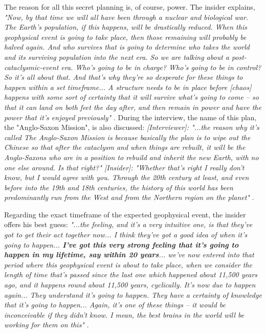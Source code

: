 \documentclass[10pt,twocolumn,letterpaper]{article}
\begin{document}
The reason for all this secret planning is, of course, power. The insider explains, \textit{"Now, by that time we will all have been through a nuclear and biological war. The Earth's population, if this happens, will be drastically reduced. When this geophysical event is going to take place, then those remaining will probably be halved again. And who survives that is going to determine who takes the world and its surviving population into the next era. So we are talking about a post-cataclysmic-event era. Who's going to be in charge? Who's going to be in control? So it's all about that. And that's why they're so desperate for these things to happen within a set timeframe... A structure needs to be in place before [chaos] happens with some sort of certainty that it will survive what's going to come -- so that it can land on both feet the day after, and then remain in power and have the power that it's enjoyed previously"} \cite{4}. During the interview, the name of this plan, the "Anglo-Saxon Mission", is also discussed: \textit{[Interviewer]: "...the reason why it's called The Anglo-Saxon Mission is because basically the plan is to wipe out the Chinese so that after the cataclysm and when things are rebuilt, it will be the Anglo-Saxons who are in a position to rebuild and inherit the new Earth, with no one else around. Is that right?" [Insider]: "Whether that's right I really don't know, but I would agree with you. Through the 20th century at least, and even before into the 19th and 18th centuries, the history of this world has been predominantly run from the West and from the Northern region on the planet"} \cite{4}.

Regarding the exact timeframe of the expected geophysical event, the insider offers his best guess: \textit{"...the feeling, and it's a very intuitive one, is that they've got to get their act together now... I think they've got a good idea of when it's going to happen... \textbf{I've got this very strong feeling that it's going to happen in my lifetime, say within 20 years}... we've now entered into that period where this geophysical event is about to take place, when we consider the length of time that's passed since the last one which happened about 11,500 years ago, and it happens round about 11,500 years, cyclically. It's now due to happen again... They understand it's going to happen. They have a certainty of knowledge that it's going to happen... Again, it's one of these things -- it would be inconceivable if they didn't know. I mean, the best brains in the world will be working for them on this"} \cite{4}.
\end{document}
